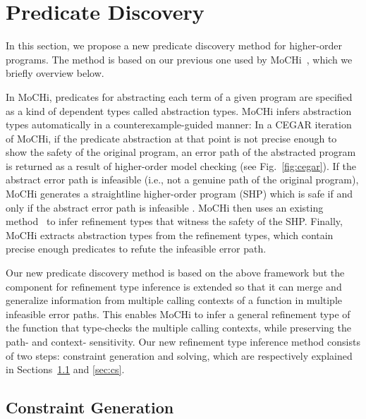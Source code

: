 

\section{Predicate Discovery}

In this section, we propose a new predicate discovery method for 
higher-order programs.  The method is based on our previous one used by 
MoCHi~\cite{KobayashiPLDI2011}, which we briefly overview below.

In MoCHi, predicates for abstracting each term of a given program are 
specified as a kind of dependent types called abstraction types.  MoCHi 
infers abstraction types automatically in a counterexample-guided manner: 
 In a CEGAR iteration of MoCHi, if the predicate abstraction at that 
point is not precise enough to show the safety of the original program, 
an error path of the abstracted program is returned as a result of 
higher-order model checking (see Fig.~\ref{fig:cegar}).  If the abstract 
error path is infeasible (i.e., not a genuine path of the original 
program), MoCHi generates a straightline higher-order program (SHP) 
which is safe if and only if the abstract error path is infeasible .  
MoCHi then uses an existing method~\cite{Unno2009} to infer refinement 
types that witness the safety of the SHP.  Finally, MoCHi extracts 
abstraction types from the refinement types, which contain precise 
enough predicates to refute the infeasible error path.

Our new predicate discovery method is based on the above framework but 
the component for refinement type inference is extended so that it can 
merge and generalize information from multiple calling contexts of a 
function in multiple infeasible error paths.  This enables MoCHi to 
infer a general refinement type of the function that type-checks the 
multiple calling contexts, while preserving the path- and context- 
sensitivity.  Our new refinement type inference method consists of two 
steps: constraint generation and solving, which are respectively 
explained in Sections~\ref{sec:cg} and \ref{sec:cs}.

\subsection{Constraint Generation}
\label{sec:cg}

